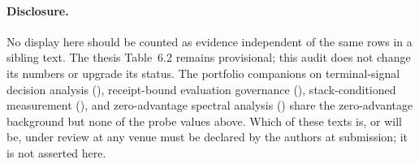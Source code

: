 \paragraph{Disclosure.}
No display here should be counted as evidence independent of the same rows in a
sibling text. The thesis Table~6.2 remains provisional; this audit does not
change its numbers or upgrade its status. The portfolio companions on
terminal-signal decision analysis (),
receipt-bound evaluation governance (),
stack-conditioned measurement
(), and
zero-advantage spectral analysis
()
share the zero-advantage background but none of the probe values above. Which of these texts is, or will be, under review at
any venue must be declared by the authors at submission; it is not asserted here.
